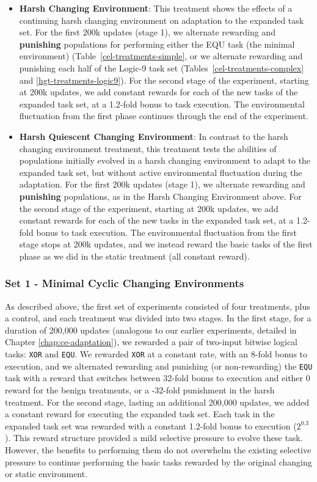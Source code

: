 \documentclass[PhD]{msu-thesis}
\begin{document}
\begin{itemize}
	\item \textbf{Harsh Changing Environment}: This treatment shows the effects of a continuing harsh changing environment on adaptation to the expanded task set. For the first 200k updates (stage 1), we alternate rewarding and \textbf{punishing} populations for performing either the EQU task (the minimal environment) (Table~\ref{cel-treatments-simple}, or we alternate rewarding and punishing each half of the Logic-9 task set (Tables~\ref{cel-treatments-complex} and \ref{hgt-treatments-logic9}). For the second stage of the experiment, starting at 200k updates, we add constant rewards for each of the new tasks of the expanded task set, at a 1.2-fold bonus to task execution. The environmental fluctuation from the first phase continues through the end of the experiment.

	\item \textbf{Harsh Quiescent Changing Environment}: In contrast to the harsh changing environment treatment, this treatment tests the abilities of populations initially evolved in a harsh changing environment to adapt to the expanded task set, but without active environmental fluctuation during the adaptation. For the first 200k updates (stage 1), we alternate rewarding and \textbf{punishing} populations, as in the Harsh Changing Environment above. For the second stage of the experiment, starting at 200k updates, we add constant rewards for each of the new tasks in the expanded task set, at a 1.2-fold bonus to task execution. The environmental fluctuation from the first stage stops at 200k updates, and we instead reward the basic tasks of the first phase as we did in the static treatment (all constant reward).
\end{itemize}

\subsubsection{Set 1 - Minimal Cyclic Changing Environments}
As described above, the first set of experiments consisted of four treatments, plus a control, and each treatment was divided into two stages. In the first stage, for a duration of 200,000 updates (analogous to our earlier experiments, detailed in Chapter \ref{chap:ce-adaptation}), we rewarded a pair of two-input bitwise logical tasks: \texttt{XOR} and \texttt{EQU}. We rewarded \texttt{XOR} at a constant rate, with an 8-fold bonus to execution, and we alternated rewarding and punishing (or non-rewarding) the \texttt{EQU} task with a reward that switches between 32-fold bonus to execution and either 0 reward for the benign treatments, or a -32-fold punishment in the harsh treatment. For the second stage, lasting an additional 200,000 updates, we added a constant reward for executing the expanded task set. Each task in the expanded task set was rewarded with a constant 1.2-fold bonus to execution ($2^{0.3}$). This reward structure provided a mild selective pressure to evolve these task. However, the benefits to performing them do not overwhelm the existing selective pressure to continue performing the basic tasks rewarded by the original changing or static environment. 
\end{document}

